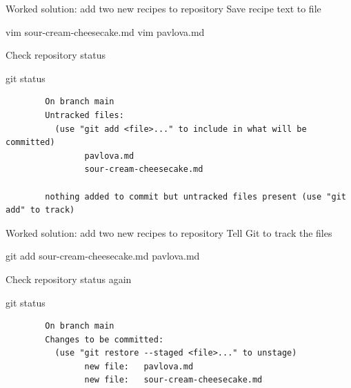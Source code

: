 \documentclass{git_course}
\begin{document}
\begin{frame}[fragile]{Worked solution: add two new recipes to repository}
    Save recipe text to file
    \begin{shellcode}
        vim sour-cream-cheesecake.md
        vim pavlova.md
    \end{shellcode}

    Check repository status
    \begin{shellcode}
        git status
    \end{shellcode}
    \begin{verbatim}
        On branch main
        Untracked files:
          (use "git add <file>..." to include in what will be committed)
                pavlova.md
                sour-cream-cheesecake.md

        nothing added to commit but untracked files present (use "git add" to track)
    \end{verbatim}
\end{frame}

\begin{frame}[fragile]{Worked solution: add two new recipes to repository}
    Tell Git to track the files
    \begin{shellcode}
        git add sour-cream-cheesecake.md pavlova.md
    \end{shellcode}

    Check repository status again
    \begin{shellcode}
        git status
    \end{shellcode}
    \begin{verbatim}
        On branch main
        Changes to be committed:
          (use "git restore --staged <file>..." to unstage)
                new file:   pavlova.md
                new file:   sour-cream-cheesecake.md
    \end{verbatim}
\end{frame}
\end{document}
